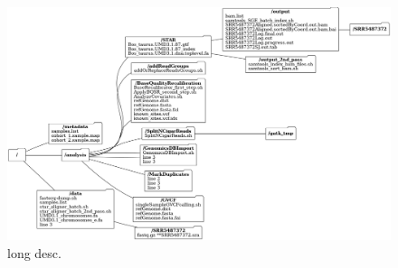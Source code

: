 \begin{figure}
\begin{center}

\includegraphics[width=\textwidth]{misc/tree.png}
\caption[caption] {long desc.}

\end{center}
\end{figure}


